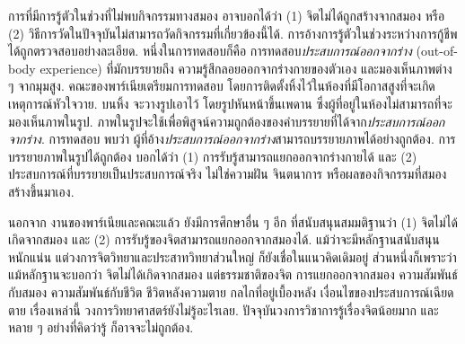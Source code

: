 {\begin{shaded}
		การที่มีการรู้ตัวในช่วงที่ไม่พบกิจกรรมทางสมอง
		อาจบอกได้ว่า (1) จิตไม่ได้ถูกสร้างจากสมอง 
		หรือ (2) วิธีการวัดในปัจจุบันไม่สามารถวัดกิจกรรมที่เกี่ยวข้องนี้ได้.
		การอ้างการรู้ตัวในช่วงระหว่างการกู้ชีพได้ถูกตรวจสอบอย่างละเอียด.
		หนึ่งในการทดสอบก็คือ การทดสอบ\textit{ประสบการณ์ออกจากร่าง} (out-of-body experience) 
		ที่มักบรรยายถึง ความรู้สึกลอยออกจากร่างกายของตัวเอง และมองเห็นภาพต่าง ๆ จากมุมสูง.
		คณะของพาร์เนียเตรียมการทดสอบ
		โดยการติดตั้งหิ้งไว้ในห้องที่มีโอกาสสูงที่จะเกิดเหตุการณ์หัวใจวาย.
		บนหิ้ง จะวางรูปเอาไว้ โดยรูปหันหน้าขึ้นเพดาน ซึ่งผู้ที่อยู่ในห้องไม่สามารถที่จะมองเห็นภาพในรูป.
		ภาพในรูปจะใช้เพื่อพิสูจน์ความถูกต้องของคำบรรยายที่ได้จาก\textit{ประสบการณ์ออกจากร่าง}.
		การทดสอบ พบว่า ผู้ที่อ้าง\textit{ประสบการณ์ออกจากร่าง}สามารถบรรยายภาพได้อย่างถูกต้อง.
		การบรรยายภาพในรูปได้ถูกต้อง บอกได้ว่า
		(1) การรับรู้สามารถแยกออกจากร่างกายได้
		และ (2) ประสบการณ์ที่บรรยายเป็นประสบการณ์จริง ไม่ใช่ความฝัน จินตนาการ หรือผลของกิจกรรมที่สมองสร้างขึ้นมาเอง.
		
		นอกจาก งานของพาร์เนียและคณะแล้ว ยังมีการศึกษาอื่น ๆ อีก\cite{vanLommelEtAl2001a, TuckerEtAl2017a} ที่สนับสนุนสมมติฐานว่า (1) จิตไม่ได้เกิดจากสมอง 
		และ (2) การรับรู้ของจิตสามารถแยกออกจากสมองได้.
		แม้ว่าจะมีหลักฐานสนับสนุนหนักแน่น แต่วงการจิตวิทยาและประสาทวิทยาส่วนใหญ่ ก็ยังเชื่อในแนวคิดเดิมอยู่
		ส่วนหนึ่งก็เพราะว่า แม้หลักฐานจะบอกว่า จิตไม่ได้เกิดจากสมอง 
		แต่ธรรมชาติของจิต การแยกออกจากสมอง ความสัมพันธ์กับสมอง ความสัมพันธ์กับชีวิต ชีวิตหลังความตาย กลไกที่อยู่เบื้องหลัง เงื่อนไขของประสบการณ์เฉียดตาย เรื่องเหล่านี้ วงการวิทยาศาสตร์ยังไม่รู้อะไรเลย.
		ปัจจุบันวงการวิชาการรู้เรื่องจิตน้อยมาก และหลาย ๆ อย่างที่คิดว่ารู้ ก็อาจจะไม่ถูกต้อง.
		
\vspace{0.5cm}		
\begin{Parallel}[c]{0.48\textwidth}{0.35\textwidth}
\end{Parallel}
		

\end{shaded}}
